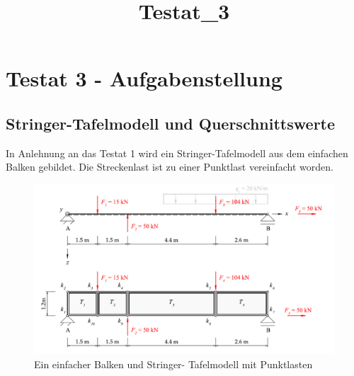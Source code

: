 \documentclass[
  12pt,
  letterpaper,
  DIV=11,
  egregdoesnotlikesansseriftitles]{scrartcl}
\title{Testat\_3}
\author{}
\date{}
\renewcommand{\maketitle}{}
\begin{document}
\maketitle
\ifdefined\Shaded\renewenvironment{Shaded}{\begin{tcolorbox}[sharp corners, breakable, boxrule=0pt, interior hidden, enhanced, borderline west={3pt}{0pt}{shadecolor}, frame hidden]}{\end{tcolorbox}}\fi

\hypertarget{testat-3---aufgabenstellung}{%
\section{Testat 3 -
Aufgabenstellung}\label{testat-3---aufgabenstellung}}

\hypertarget{stringer-tafelmodell-und-querschnittswerte}{%
\subsection{Stringer-Tafelmodell und
Querschnittswerte}\label{stringer-tafelmodell-und-querschnittswerte}}

In Anlehnung an das Testat 1 wird ein Stringer-Tafelmodell aus dem
einfachen Balken gebildet. Die Streckenlast ist zu einer Punktlast
vereinfacht worden.

\begin{figure}[H]

{\centering \includegraphics{BSI_HS23_Testat_03_files/mediabag/../images/Testat_03_HS23.pdf}

}

\caption{\label{fig-system}Ein einfacher Balken und Stringer-
Tafelmodell mit Punktlasten}

\end{figure}
\end{document}

